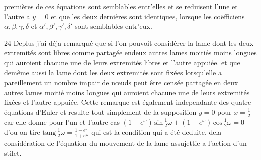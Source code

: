 \documentclass[11pt,a4paper]{article}
\begin{document}


 premières de ces équations sont semblables entr'elles et se
reduisent l'une et l'autre a $y = 0$ et que les deux dernières
sont identiques,  lorsque \struck{\ill{}} les coëfficiens $\alpha, \beta, \gamma, \delta$ et $\alpha', \beta', \gamma', \delta'$
sont semblables entr'eux.

24 Deplus j'ai déja remarqué que si l'on pouvoit considérer 
la lame dont les deux extremités sont libres  comme partagée
endeux autres lames moitiés moins longues qui auroient chacune une
de leurs extremités libres et l'autre appuiée. et que demême aussi
la lame dont les deux extremités sont fixées lorsqu'elle a pareillement
un nombre impair de nœuds peut être censée partagée en deux
autres lames moitié moins longues qui auroient chacune une de leurs
extremités fixées et l'autre appuiée, Cette remarque est également
independante des quatre équations d'Euler et resulte tout
simplement de la supposition $y = 0$ pour $x = \frac{1}{2}$ car elle
donne pour l'un et l'autre cas $(1+e^{\omega})\,\text{sin}\,\frac{1}{2}\omega + (1-e^{\omega})\,\text{cos}\,\frac{1}{2}\omega = 0$
d'ou on tire $\text{tang}\,\frac{1}{2}\omega = \frac{1-e^{\omega}}{1+e^{\omega}}$ qui est la condition  qui a été
deduite. dela considération de l'équation du mouvement de
la lame assujettie a l'action d'un stilet.
\end{document}
